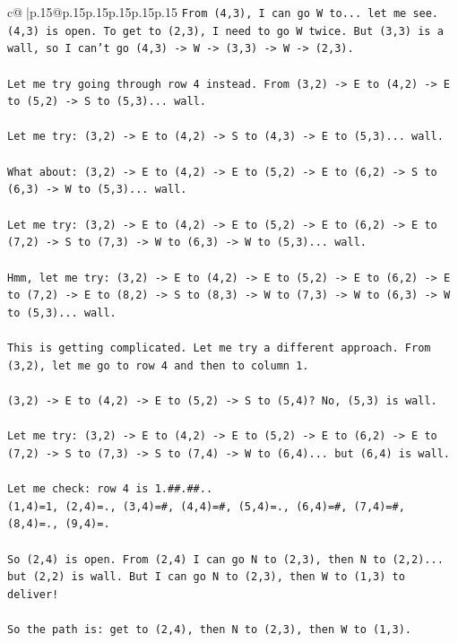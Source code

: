 \documentclass{article}
\begin{document}
{\begin{supertabular}{c@{$\;$}|p{.15\linewidth}@{}p{.15\linewidth}p{.15\linewidth}p{.15\linewidth}p{.15\linewidth}p{.15\linewidth}}
{{{\texttt{From (4,3), I can go W to... let me see. (4,3) is open. To get to (2,3), I need to go W twice. But (3,3) is a wall, so I can't go (4,3) {-}> W {-}> (3,3) {-}> W {-}> (2,3).} \\
\\ 
\texttt{Let me try going through row 4 instead. From (3,2) {-}> E to (4,2) {-}> E to (5,2) {-}> S to (5,3)... wall. } \\
\\ 
\texttt{Let me try: (3,2) {-}> E to (4,2) {-}> S to (4,3) {-}> E to (5,3)... wall.} \\
\\ 
\texttt{What about: (3,2) {-}> E to (4,2) {-}> E to (5,2) {-}> E to (6,2) {-}> S to (6,3) {-}> W to (5,3)... wall.} \\
\\ 
\texttt{Let me try: (3,2) {-}> E to (4,2) {-}> E to (5,2) {-}> E to (6,2) {-}> E to (7,2) {-}> S to (7,3) {-}> W to (6,3) {-}> W to (5,3)... wall.} \\
\\ 
\texttt{Hmm, let me try: (3,2) {-}> E to (4,2) {-}> E to (5,2) {-}> E to (6,2) {-}> E to (7,2) {-}> E to (8,2) {-}> S to (8,3) {-}> W to (7,3) {-}> W to (6,3) {-}> W to (5,3)... wall.} \\
\\ 
\texttt{This is getting complicated. Let me try a different approach. From (3,2), let me go to row 4 and then to column 1.} \\
\\ 
\texttt{(3,2) {-}> E to (4,2) {-}> E to (5,2) {-}> S to (5,4)? No, (5,3) is wall.} \\
\\ 
\texttt{Let me try: (3,2) {-}> E to (4,2) {-}> E to (5,2) {-}> E to (6,2) {-}> E to (7,2) {-}> S to (7,3) {-}> S to (7,4) {-}> W to (6,4)... but (6,4) is wall.} \\
\\ 
\texttt{Let me check: row 4 is 1.\#\#.\#\#..} \\
\texttt{(1,4)=1, (2,4)=., (3,4)=\#, (4,4)=\#, (5,4)=., (6,4)=\#, (7,4)=\#, (8,4)=., (9,4)=.} \\
\\ 
\texttt{So (2,4) is open. From (2,4) I can go N to (2,3), then N to (2,2)... but (2,2) is wall. But I can go N to (2,3), then W to (1,3) to deliver!} \\
\\ 
\texttt{So the path is: get to (2,4), then N to (2,3), then W to (1,3).} \\
}}}
\end{supertabular}}
\end{document}
